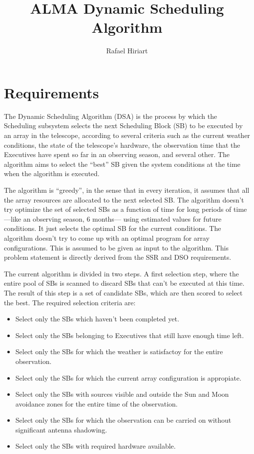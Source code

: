 \documentclass{article}
\title{ALMA Dynamic Scheduling Algorithm}
\author{Rafael Hiriart}
\begin{document}
\maketitle

\section{Requirements}

The Dynamic Scheduling Algorithm (DSA) is the process by which the Scheduling
subsystem selects the next Scheduling Block (SB) to be executed by an array in the
telescope, according to several criteria such as the current weather conditions,
the state of the telescope's hardware, the observation time that the Executives 
have spent so far in an observing season, and several other. The algorithm aims to
select the ``best'' SB given the system conditions at the time when the algorithm is
executed.

The algorithm is ``greedy'', in the sense that in every iteration, it assumes
that all the array resources are allocated to the next selected SB. The algorithm doesn't
try optimize the set of selected SBs as a function of time for long periods of time
---like an observing season, 6 months--- using estimated values for future conditions.
It just selects the optimal SB for the current conditions. The algorithm doesn't try to
come up with an optimal program for array configurations. This is assumed to be given as
input to the algorithm. This problem statement is directly derived from the SSR and
DSO requirements.

The current algorithm is divided in two steps. A first selection step, where the entire
pool of SBs is scanned to discard SBs that can't be executed
at this time. The result of this step is a set of candidate SBs, which are then scored
to select the best. The required selection criteria are:
\begin{itemize}
\item Select only the SBs which haven't been completed yet.
\item Select only the SBs belonging to Executives that still have enough time left.
\item Select only the SBs for which the weather is satisfactoy for the entire observation.
\item Select only the SBs for which the current array configuration is appropiate.
\item Select only the SBs with sources visible and outside the Sun and Moon avoidance zones
for the entire time of the observation.
\item Select only the SBs for which the observation can be carried on without significant
antenna shadowing.
\item Select only the SBs with required hardware available.
\end{itemize} 
\end{document}
